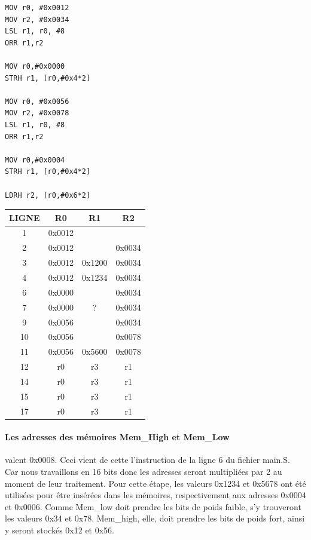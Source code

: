 \documentclass[a4paper]{article} %
\begin{document}
\begin{lstlisting}[caption=main.S,label=et1]
MOV r0, #0x0012
MOV r2, #0x0034
LSL r1, r0, #8
ORR r1,r2

MOV r0,#0x0000
STRH r1, [r0,#0x4*2]

MOV r0, #0x0056
MOV r2, #0x0078
LSL r1, r0, #8
ORR r1,r2

MOV r0,#0x0004
STRH r1, [r0,#0x4*2]

LDRH r2, [r0,#0x6*2]
\end{lstlisting}


\begin{center}
\begin{tabular}{|c|c|c|c|}
    \hline
    LIGNE  & R0     & R1     & R2     \\
    \hline
    1      & 0x0012 &        &        \\
    \hline
    2      & 0x0012 &        & 0x0034 \\
    \hline
    3      & 0x0012 & 0x1200 & 0x0034 \\
    \hline
    4      & 0x0012 & 0x1234 & 0x0034 \\
    \hline
    6      & 0x0000 &        & 0x0034 \\
    \hline
    7      & 0x0000 & ?      & 0x0034  \\
    \hline
    9      & 0x0056 &        & 0x0034 \\
    \hline
    10     & 0x0056 &        & 0x0078 \\
    \hline
    11     & 0x0056 & 0x5600 & 0x0078 \\
    \hline
    12     & r0 & r3   & r1  \\
    \hline
    14     & r0 & r3   & r1  \\
    \hline
    15    & r0 & r3   & r1  \\
    \hline
    17     & r0 & r3   & r1  \\
    \hline
\end{tabular}
\end{center}

\paragraph{Les adresses des mémoires Mem\_High et Mem\_Low} valent 0x0008. Ceci vient de cette l'instruction de la ligne 6 du fichier main.S. Car nous travaillons en 16 bits donc les adresses seront multipliées par 2 au moment de leur traitement.
Pour cette étape, les valeurs 0x1234 et 0x5678 ont été utilisées pour être insérées dans les mémoires, respectivement aux adresses 0x0004 et 0x0006. Comme Mem\_low doit prendre les bits de poids faible, s'y trouveront les valeurs 0x34 et 0x78. Mem\_high, elle, doit prendre les bits de poids fort, ainsi y seront stockés 0x12 et 0x56.
\end{document}
